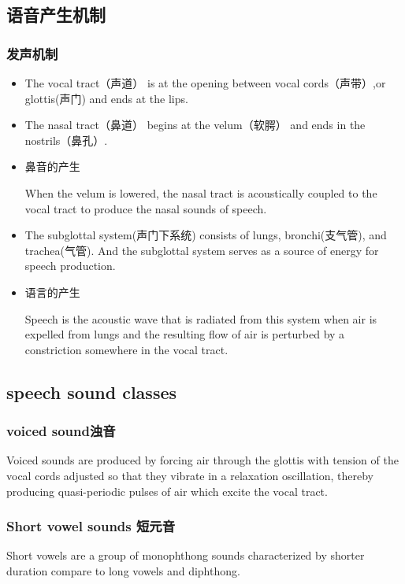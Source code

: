 \documentclass[UTF8]{ctexart}
\begin{document}
\subsection{语音产生机制}
\subsubsection{发声机制}
\begin{itemize}
    \item The vocal tract（声道） is at the opening between vocal cords（声带）,or glottis(声门) and ends at the lips.
    \item The nasal tract（鼻道） begins at the velum（软腭） and ends in the nostrils（鼻孔）.
    \item 鼻音的产生
    
    When the velum is lowered, the nasal tract is acoustically coupled to the vocal tract to produce the nasal sounds of speech.
    \item The subglottal system(声门下系统) consists of lungs, bronchi(支气管), and trachea(气管). And the subglottal system serves as a source of energy for speech production.
    \item 语言的产生
    
    Speech is the acoustic wave that is radiated from this system when air is expelled from lungs and the resulting flow of air is perturbed by a constriction somewhere in the vocal tract.
\end{itemize}

\subsection{speech sound classes}

\subsubsection{voiced sound浊音}
Voiced sounds are produced by forcing air through the glottis with tension of the vocal cords adjusted so that they vibrate in a relaxation oscillation, thereby producing quasi-periodic pulses of air which excite the vocal tract.

\subsubsection{Short vowel sounds 短元音}
Short vowels are a group of monophthong sounds characterized by shorter duration compare to long vowels and diphthong.
\end{document}
